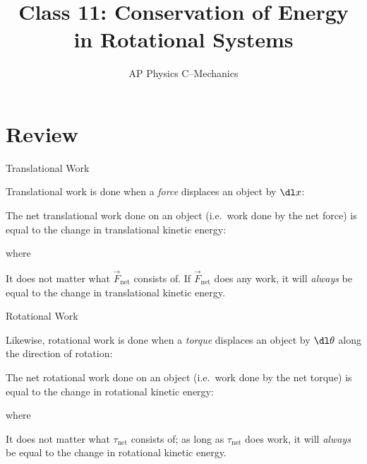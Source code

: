 \documentclass[12pt,compress,aspectratio=169]{beamer}
\title{Class 11: Conservation of Energy in Rotational Systems}
\subtitle{AP Physics C--Mechanics}
\begin{document}
\begin{frame}
  \maketitle
\end{frame}



\section{Review}

\begin{frame}{Translational Work}

  Translational work is done when a \emph{force} displaces an object by $\dl x$:


  The net translational work done on an object (i.e.\ work done by the net
  force) is equal to the change in translational kinetic energy:


  \vspace{-.1in}where


  It does not matter what $\vec F_\text{net}$ consists of. If $\vec F_\text{net}$
  does any work, it will \emph{always} be equal to the change in translational
  kinetic energy.
\end{frame}



\begin{frame}{Rotational Work}

  Likewise, rotational work is done when a \emph{torque} displaces an object by
  $\dl\theta$ along the direction of rotation:


  The net rotational work done on an object (i.e.\ work done by the net torque)
  is equal to the change in rotational kinetic energy:


  \vspace{-.1in}where


  \vspace{-.1in}It does not matter what $\tau_\text{net}$ consists of; as long as
  $\tau_\text{net}$ does work, it will \emph{always} be equal to the change in
  rotational kinetic energy.
\end{frame}
\end{document}
